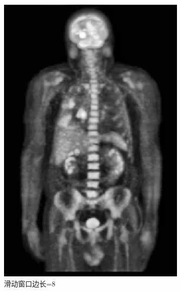 \documentclass[a4paper]{ctexart}
\newcommand{\outwfour}{0.23\textwidth}
\begin{document}
\begin{spacing}{1.35}
\begin{figure}[htbp]
\begin{subfigure}[t]{\outwfour}
			\includegraphics[width=\textwidth]{figure/2_tile_grid_size_8.png}
			\caption{滑动窗口边长=8}
		\end{subfigure}
		\begin{subfigure}[t]{\outwfour}
			\centering

\end{subfigure}
\end{figure}
\end{spacing}
\end{document}
